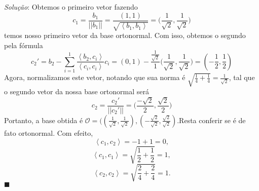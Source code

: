 \documentclass{article}
\renewcommand\qedsymbol{$\blacksquare$}
\begin{document}
\textit{Solu\c c\~ao}: Obtemos o primeiro vetor fazendo 
  $$
  c _{1} = \frac{b _{1}}{||b _{1}||} = \frac{(1, 1)}{\sqrt{\left< b_1, b_1 \right>}} = \biggl(\frac{1}{\sqrt{2}}, \frac{1}{\sqrt{2}}\biggr)
  $$
temos nosso primeiro vetor da base ortonormal. Com isso, obtemos o segundo pela f\'ormula 
  $$
  c_2' = b_2 - \sum _{i=1}^{1} \frac{\left< b _{2}, c _{i} \right>}{\left< c _{i}, c _{i} \right>}c _{i} =
  (0, 1) - \frac{\frac{1}{\sqrt{2}}}{1}\biggl(\frac{1}{\sqrt{2}}, \frac{1}{\sqrt{2}}\biggr) = (-\frac{1}{2}, \frac{1}{2})
  $$
  Agora, normalizamos este vetor, notando que sua norma \'e $\sqrt{\frac{1}{4} + \frac{1}{4}} = \frac{1}{\sqrt{2}}$, tal que
o segundo vetor da nossa base ortonormal ser\'a
  $$
  c _{2} = \frac{c _{2}'}{||c _{2}'||} = \biggl(\frac{-\sqrt{2}}{2}, \frac{\sqrt{2}}{2}\biggr)
  $$
  Portanto, a base obtida \'e $\mathcal{O} = ((\frac{1}{\sqrt{2}}, \frac{1}{\sqrt{2}}), (-\frac{\sqrt{2}}{\sqrt{2}}, \frac{\sqrt{2}}{\sqrt{2}})$.Resta conferir se \'e de fato ortonormal. Com efeito,
  $$
  \left< c _{1}, c _{2} \right> = -1 + 1 = 0,
  $$
  $$
  \left< c _{1}, c _{1} \right> = \sqrt{\frac{1}{2} + \frac{1}{2}} = 1,
  $$
  $$
  \left< c _{2}, c _{2} \right> = \sqrt{\frac{2}{4} + \frac{2}{4}} = 1.
  $$
  \qedsymbol
\end{document}

